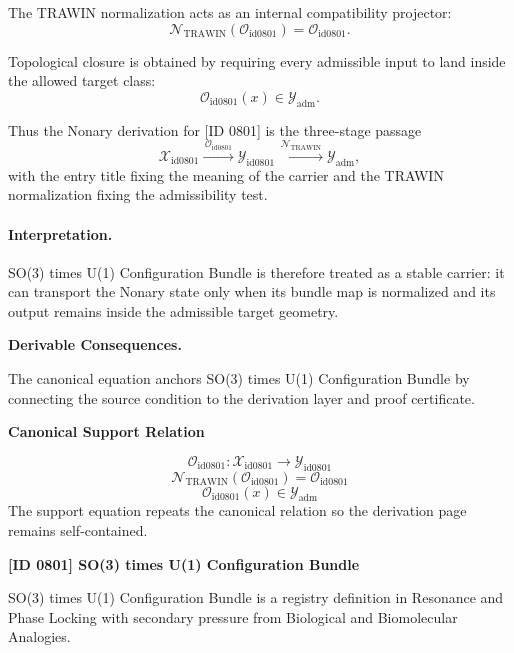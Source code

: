 The TRAWIN normalization acts as an internal compatibility projector:\[
\mathcal{N}_{\mathrm{TRAWIN}}(\mathcal{O}_{\mathrm{id0801}})=\mathcal{O}_{\mathrm{id0801}}.
\]

Topological closure is obtained by requiring every admissible input to land inside the allowed target class:\[
\mathcal{O}_{\mathrm{id0801}}(x)\in\mathcal{Y}_{\mathrm{adm}}.
\]

Thus the Nonary derivation for [ID 0801] is the three-stage passage
\[
\mathcal{X}_{\mathrm{id0801}}\xrightarrow{\,\mathcal{O}_{\mathrm{id0801}}\,} \mathcal{Y}_{\mathrm{id0801}}\xrightarrow{\,\mathcal{N}_{\mathrm{TRAWIN}}\,} \mathcal{Y}_{\mathrm{adm}},
\]
with the entry title fixing the meaning of the carrier and the TRAWIN normalization fixing the admissibility test.

\paragraph{Interpretation.} SO(3) times U(1) Configuration Bundle is therefore treated as a stable carrier: it can transport the Nonary state only when its bundle map is normalized and its output remains inside the admissible target geometry.

\par\vspace{0.35em}
\noindent\textbf{Derivable Consequences.}\quad
\begingroup
\footnotesize
\raggedright
The canonical equation anchors SO(3) times U(1) Configuration Bundle by connecting the source condition to the derivation layer and proof certificate.
\par\endgroup

\noindent\textbf{Canonical Support Relation}\par
\[
\mathcal{O}_{\mathrm{id0801}}:\mathcal{X}_{\mathrm{id0801}}\longrightarrow\mathcal{Y}_{\mathrm{id0801}}
\]
\[
\mathcal{N}_{\mathrm{TRAWIN}}(\mathcal{O}_{\mathrm{id0801}})=\mathcal{O}_{\mathrm{id0801}}
\]
\[
\mathcal{O}_{\mathrm{id0801}}(x)\in\mathcal{Y}_{\mathrm{adm}}
\]
\noindent The support equation repeats the canonical relation so the derivation page remains self-contained.\par

\clearpage
\noindent\textbf{[ID 0801] SO(3) times U(1) Configuration Bundle}\par
\vspace{0.35em}
\begingroup\small
{}
SO(3) times U(1) Configuration Bundle is a registry definition in Resonance and Phase Locking with secondary pressure from Biological and Biomolecular Analogies.

